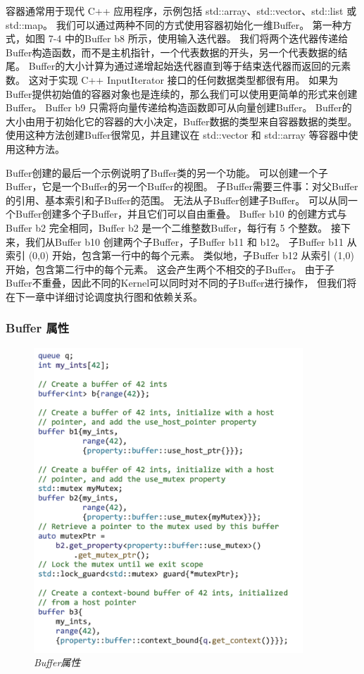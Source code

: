 容器通常用于现代 C++ 应用程序，示例包括 std::array、std::vector、std::list 或 std::map。 
我们可以通过两种不同的方式使用容器初始化一维Buffer。 第一种方式，如图 7-4 中的Buffer b8 所示，使用输入迭代器。 
我们将两个迭代器传递给Buffer构造函数，而不是主机指针，一个代表数据的开头，另一个代表数据的结尾。 
Buffer的大小计算为通过递增起始迭代器直到等于结束迭代器而返回的元素数。 
这对于实现 C++ InputIterator 接口的任何数据类型都很有用。 
如果为Buffer提供初始值的容器对象也是连续的，那么我们可以使用更简单的形式来创建Buffer。 
Buffer b9 只需将向量传递给构造函数即可从向量创建Buffer。 
Buffer的大小由用于初始化它的容器的大小决定，Buffer数据的类型来自容器数据的类型。 
使用这种方法创建Buffer很常见，并且建议在 std::vector 和 std::array 等容器中使用这种方法。

Buffer创建的最后一个示例说明了Buffer类的另一个功能。 可以创建一个子Buffer，它是一个Buffer的另一个Buffer的视图。
 子Buffer需要三件事：对父Buffer的引用、基本索引和子Buffer的范围。 无法从子Buffer创建子Buffer。 
 可以从同一个Buffer创建多个子Buffer，并且它们可以自由重叠。 
 Buffer b10 的创建方式与Buffer b2 完全相同，Buffer b2 是一个二维整数Buffer，每行有 5 个整数。 
 接下来，我们从Buffer b10 创建两个子Buffer，子Buffer b11 和 b12。 
 子Buffer b11 从索引 (0,0) 开始，包含第一行中的每个元素。 
 类似地，子Buffer b12 从索引 (1,0) 开始，包含第二行中的每个元素。 
 这会产生两个不相交的子Buffer。 由于子Buffer不重叠，因此不同的Kernel可以同时对不同的子Buffer进行操作，
 但我们将在下一章中详细讨论调度执行图和依赖关系。

\subsubsection{Buffer 属性}

\begin{figure}[H]
	\centering
	\includegraphics[width=0.9\textwidth]{figs/F7.5.png}
	\caption{\textit{Buffer属性 }}
\end{figure}

